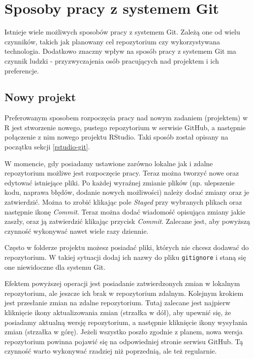 \documentclass[paper=6in:9in,pagesize=pdftex,headinclude=on,footinclude=on,10pt]{scrbook}
\let\BeginKnitrBlock\begin \let\EndKnitrBlock\end
\begin{document}
\hypertarget{sposoby-pracy-z-systemem-git}{%
\section{Sposoby pracy z systemem Git}\label{sposoby-pracy-z-systemem-git}}

Istnieje wiele możliwych sposobów pracy z systemem Git.
Zależą one od wielu czynników, takich jak planowany cel repozytorium czy wykorzystywana technologia.
Dodatkowo znaczny wpływ na sposób pracy z systemem Git ma czynnik ludzki - przyzwyczajenia osób pracujących nad projektem i ich preferencje.

\hypertarget{nowy-projekt}{%
\subsection{Nowy projekt}\label{nowy-projekt}}

Preferowanym sposobem rozpoczęcia pracy nad nowym zadaniem (projektem) w R jest stworzenie nowego, pustego repozytorium w serwisie GitHub, a następnie połączenie z nim nowego projektu RStudio.
Taki sposób został opisany na początku sekcji \ref{rstudio-git}.

W momencie, gdy posiadamy ustawione zarówno lokalne jak i zdalne repozytorium możliwe jest rozpoczęcie pracy.
Teraz można tworzyć nowe oraz edytować istniejące pliki.
Po każdej wyraźnej zmianie plików (np. ulepszenie kodu, naprawa błędów, dodanie nowych możliwości) należy dodać zmiany oraz je zatwierdzić.
Można to zrobić klikając pole \emph{Staged} przy wybranych plikach oraz następnie ikonę \emph{Commit}.
Teraz można dodać wiadomość opisująca zmiany jakie zaszły, oraz ją zatwierdzić klikając przycisk \emph{Commit}.
Zalecane jest, aby powyższą czynność wykonywać nawet wiele razy dziennie.

\BeginKnitrBlock{rmdinfo}
Często w folderze projektu możesz posiadać pliki, których nie chcesz dodawać do repozytorium.
W takiej sytuacji dodaj ich nazwy do pliku \texttt{gitignore} i staną się one niewidoczne dla systemu Git.
\EndKnitrBlock{rmdinfo}

Efektem powyższej operacji jest posiadanie zatwierdzonych zmian w lokalnym repozytorium, ale jeszcze ich brak w repozytorium zdalnym.
Kolejnym krokiem jest przesłanie zmian na zdalne repozytorium.
Tutaj zalecane jest najpierw kliknięcie ikony aktualizowania zmian (strzałka w dół), aby upewnić się, że posiadamy aktualną wersję repozytorium, a następnie kliknięcie ikony wysyłania zmian (strzałka w górę).
Jeżeli wszystko poszło zgodnie z planem, nowa wersja repozytorium powinna pojawić się na odpowiedniej stronie serwisu GitHub.
Tą czynność warto wykonywać rzadziej niż poprzednią, ale też regularnie.
\end{document}
